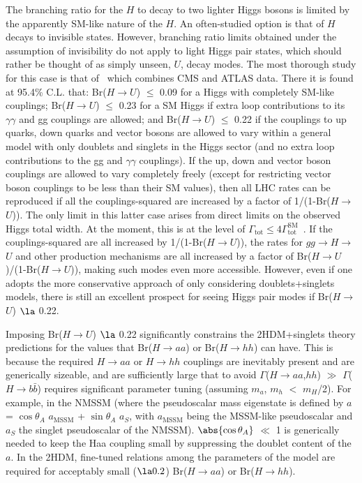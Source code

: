 The branching ratio for the $H$ to decay to two lighter Higgs bosons is limited by the apparently SM-like nature of the $H$. An often-studied option is that of $H$ decays to invisible states. However, branching ratio limits obtained under the assumption of invisibility do not apply to light Higgs pair states, which should rather be thought of as simply unseen, $U$, decay modes. The most thorough study for this case is that of~\cite{Bernon:2014vta} which combines CMS and ATLAS data. There it is found at 95.4\% C.L. that: Br($H$$\rightarrow$$U$) $\le$ 0.09 for a Higgs with completely SM-like couplings; Br($H$$\rightarrow$$U$) $\le$ 0.23 for a SM Higgs if extra loop contributions to its $\gamma\gamma$ and gg couplings are allowed; and Br($H$$\rightarrow$$U$) $\le$ 0.22 if the couplings to up quarks, down quarks and vector bosons are allowed to vary within a general model with only doublets and singlets in the Higgs sector (and no extra loop contributions to the gg and $\gamma\gamma$ couplings). If the up, down and vector boson couplings are allowed to vary completely freely (except for restricting vector boson couplings to be less than their SM values), then all LHC rates can be reproduced if all the couplings-squared are increased by a factor of 1/(1-Br($H$$\rightarrow$$U$)). The only limit in this latter case arises from direct limits on the observed Higgs total width.  At the moment, this is at the level of $\Gamma_{\text{tot}} \le 4\Gamma_{\text{tot}}^{\text{SM}}$~\cite{CMSHwidth}. If the couplings-squared are all increased by 1/(1-Br($H$$\rightarrow$$U$)), the rates for $gg$$\rightarrow$$H$$\rightarrow$$U$ and other production mechanisms are all increased by a factor of Br($H$$\rightarrow$$U$)/(1-Br($H$$\rightarrow$$U$)), making such modes even more accessible. However, even if one adopts the more conservative approach of only considering doublets+singlets models, there is still an excellent prospect for seeing Higgs pair modes if Br($H$$\rightarrow$$U$) $\la$ 0.22.

Imposing Br($H$$\rightarrow$$U$) $\la$ 0.22 significantly constrains the 2HDM+singlets theory predictions for the values that Br($H$$\rightarrow$$aa$) or Br($H$$\rightarrow$$hh$) can have.  This is because the required $H$$\rightarrow$$aa$ or $H$$\rightarrow$$hh$ couplings are inevitably present and are generically sizeable, and are sufficiently large that to avoid $\Gamma$($H$$\rightarrow$$aa$,$hh$) $\gg$ $\Gamma$($H$$\rightarrow$$b\bar{b}$) requires significant parameter tuning (assuming $m_a$, $m_h$ $<$ $m_H$/2). For example, in the NMSSM (where the pseudoscalar mass eigenstate is defined by $a$ = $\cos\theta_A$ $a_{\text{MSSM}}$ + $\sin\theta_A$ $a_S$, with $a_{\text{MSSM}}$ being the MSSM-like pseudoscalar and $a_S$ the singlet pseudoscalar of the NMSSM). $\abs{\cos\theta_A}$ $\ll$ 1 is generically needed to keep the Haa coupling small by suppressing the doublet content of the $a$.  In the 2HDM, fine-tuned relations among the parameters of the model are required for acceptably small ($\la 0.2$) Br($H$$\rightarrow$$aa$) or Br($H$$\rightarrow$$hh$).

